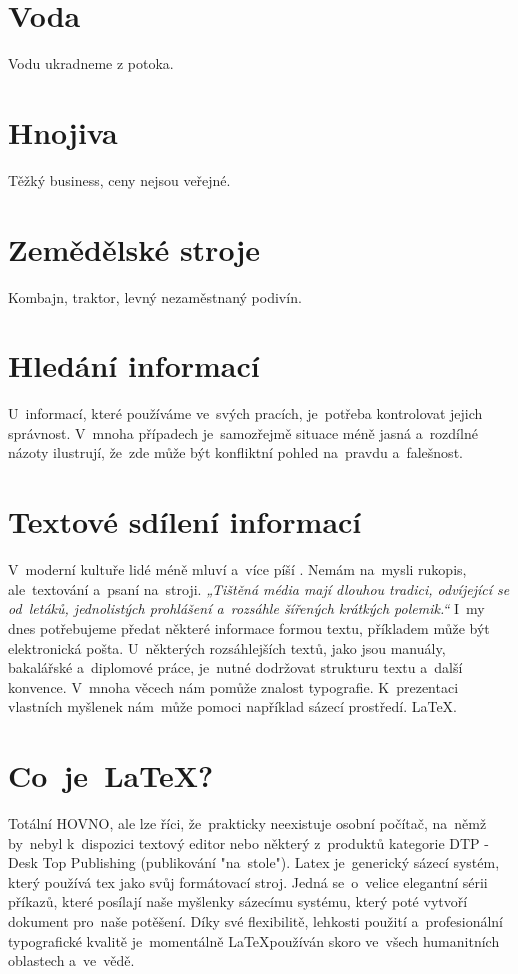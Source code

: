 \documentclass[11pt,a4paper,titlepage]{article}
\begin{document}
\section{Voda}
Vodu ukradneme z potoka.


\section{Hnojiva}
Těžký business, ceny nejsou veřejné.


\section{Zemědělské stroje}
Kombajn, traktor, levný nezaměstnaný podivín.


\section{Hledání informací}
U~informací, které používáme ve~svých pracích, je~potřeba kontrolovat jejich správnost. V~mnoha případech je~samozřejmě situace méně jasná a~rozdílné názoty ilustrují, že~zde může být konfliktní pohled na~pravdu a~falešnost.\cite{Ar_Information}


\section{Textové sdílení informací}
V~moderní kultuře lidé méně mluví a~více píší . Nemám na~mysli rukopis, ale~textování a~psaní na~stroji.
\cite{Ar_Luv2TxT}
\textit{„Tištěná média mají dlouhou tradici, odvíjející se od~letáků, jednolistých prohlášení a~rozsáhle šířených krátkých polemik.“}\cite{Douda_informace} I~my dnes potřebujeme předat některé informace formou textu, příkladem může být elektronická pošta. U~některých rozsáhlejších textů, jako jsou manuály, bakalářské a~diplomové práce, je~nutné dodržovat strukturu textu a~další konvence. V~mnoha věcech nám pomůže znalost typografie. K~prezentaci vlastních myšlenek nám~může pomoci například sázecí prostředí. \LaTeX .


\section{Co~je~\LaTeX?}
Totální HOVNO, ale lze říci, že~prakticky neexistuje osobní počítač, na~němž by~nebyl k~dispozici textový editor nebo některý z~produktů kategorie DTP - Desk Top Publishing (publikování "na~stole"). \cite{RybickaLatex}
Latex je~generický sázecí systém, který používá tex jako svůj formátovací stroj.\cite{Latex_companion} Jedná se~o~velice elegantní sérii příkazů, které posílají naše myšlenky sázecímu systému, který poté vytvoří dokument pro~naše potěšení.\cite{programujte}
Díky své flexibilitě, lehkosti použití a~profesionální typografické kvalitě je~momentálně \LaTeX používán skoro ve~všech humanitních oblastech a~ve~vědě.\cite{Latex_companion}


\newpage

\end{document}
